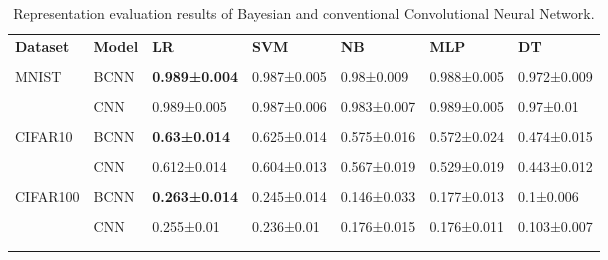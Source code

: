 \begin{table}[h]
    \centering
    \footnotesize
    \begin{tabular}{lllllll}\n\toprule\n \textbf{Dataset} &  \textbf{Model} &          \textbf{LR} &         \textbf{SVM} &          \textbf{NB} &         \textbf{MLP} &          \textbf{DT} \\\\\n\midrule\n    MNIST &  BCNN & \textbf{0.989±0.004} & 0.987±0.005 &  0.98±0.009 & 0.988±0.005 & 0.972±0.009 \\\\\n    &   CNN & 0.989±0.005 & 0.987±0.006 & 0.983±0.007 & 0.989±0.005 &   0.97±0.01 \\\\\n CIFAR10 &  BCNN &  \textbf{0.63±0.014} & 0.625±0.014 & 0.575±0.016 & 0.572±0.024 & 0.474±0.015 \\\\\n  &   CNN & 0.612±0.014 & 0.604±0.013 & 0.567±0.019 & 0.529±0.019 & 0.443±0.012 \\\\\n CIFAR100 &  BCNN & \textbf{0.263±0.014} & 0.245±0.014 & 0.146±0.033 & 0.177±0.013 &   0.1±0.006 \\\\\n  &   CNN &  0.255±0.01 &  0.236±0.01 & 0.176±0.015 & 0.176±0.011 & 0.103±0.007 \\\\\n\bottomrule\n
    \end{tabular}
    \caption[Representations evaluation for BCNN and CNN]{Representation evaluation results of Bayesian and conventional Convolutional Neural Network.}
    \label{tab:bnn_cnn}
\end{table}